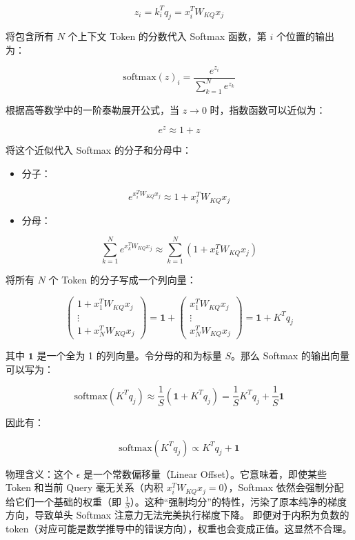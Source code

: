 \[
z_i = k_i^T q_j = x_i^T W_{KQ}x_j
\]

将包含所有 \(N\) 个上下文 Token 的分数代入 Softmax 函数，第 \(i\) 个位置的输出为：

\[
\mathrm{softmax}(z)_i = \frac{e^{z_i}}{\sum_{k=1}^{N} e^{z_k}}
\]

根据高等数学中的一阶泰勒展开公式，当 \(z \to 0\) 时，指数函数可以近似为：

\[
e^z \approx 1 + z
\]

将这个近似代入 Softmax 的分子和分母中：

\begin{itemize}
\tightlist
\item
  分子：
\end{itemize}

\[
e^{x_i^T W_{KQ}x_j} \approx 1 + x_i^T W_{KQ}x_j
\]

\begin{itemize}
\tightlist
\item
  分母：
\end{itemize}

\[
\sum_{k=1}^{N} e^{x_k^T W_{KQ}x_j} \approx \sum_{k=1}^{N}(1+x_k^T W_{KQ}x_j)
\]

将所有 \(N\) 个 Token 的分子写成一个列向量：

\[
\begin{pmatrix}
1+x_1^T W_{KQ}x_j \\
\vdots \\
1+x_N^T W_{KQ}x_j
\end{pmatrix}
= \mathbf{1}+
\begin{pmatrix}
x_1^T W_{KQ}x_j \\
\vdots \\
x_N^T W_{KQ}x_j
\end{pmatrix}
= \mathbf{1}+K^Tq_j
\]

其中 \(\mathbf{1}\) 是一个全为 1 的列向量。令分母的和为标量 \(S\)。那么 Softmax 的输出向量可以写为：

\[
\mathrm{softmax}(K^Tq_j) \approx \frac{1}{S}(\mathbf{1}+K^Tq_j)
= \frac{1}{S}K^Tq_j+\frac{1}{S}\mathbf{1}
\]

因此有：

\[
\mathrm{softmax}(K^Tq_j) \propto K^Tq_j+\mathbf{1}
\]

物理含义：这个 \(\epsilon\) 是一个常数偏移量（Linear Offset）。它意味着，即使某些 Token 和当前 Query 毫无关系（内积 \(x_i^TW_{KQ}x_j=0\)），Softmax 依然会强制分配给它们一个基础的权重（即 \(\frac{1}{S}\)）。这种``强制均分''的特性，污染了原本纯净的梯度方向，导致单头 Softmax 注意力无法完美执行梯度下降。
即便对于内积为负数的token（对应可能是数学推导中的错误方向），权重也会变成正值。这显然不合理。

